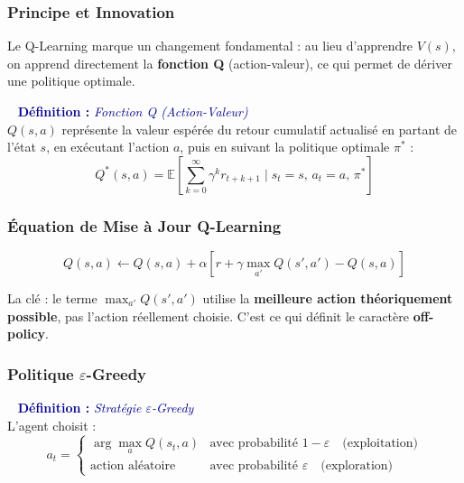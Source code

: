 \documentclass[11pt,a4paper]{article}
\newenvironment{defbox}[1]{%
  \vspace{3pt}\begin{framed}
  \noindent{\color{NavyBlue}\rule{0.3cm}{3pt}}~%
  \textcolor{DarkBlue}{\textbf{Définition :} \textit{#1}}\\[3pt]}
  {\end{framed}\vspace{3pt}}
\newcommand{\E}{\mathbb{E}}
\begin{document}
\subsubsection{Principe et Innovation}

Le Q-Learning marque un changement fondamental : au lieu d'apprendre $V(s)$, on apprend directement la \textbf{fonction Q} (action-valeur), ce qui permet de dériver une politique optimale.

\begin{defbox}{Fonction Q (Action-Valeur)}
$Q(s, a)$ représente la valeur espérée du retour cumulatif actualisé en partant de l'état $s$, en exécutant l'action $a$, puis en suivant la politique optimale $\pi^*$ :
$$Q^*(s, a) = \E\left[\sum_{k=0}^{\infty} \gamma^k r_{t+k+1} \;\Big|\; s_t=s,\, a_t=a,\, \pi^*\right]$$
\end{defbox}

\subsubsection{Équation de Mise à Jour Q-Learning}

\begin{tcolorbox}[colback=LightOrange,colframe=DarkOrange,arc=4pt]
\begin{equation}
  \boxed{Q(s,a) \leftarrow Q(s,a) + \alpha \left[r + \gamma \max_{a'} Q(s',a') - Q(s,a)\right]}
\end{equation}
\end{tcolorbox}

La clé : le terme $\max_{a'} Q(s', a')$ utilise la \textbf{meilleure action théoriquement possible}, pas l'action réellement choisie. C'est ce qui définit le caractère \textbf{off-policy}.

\subsubsection{Politique $\varepsilon$-Greedy}

\begin{defbox}{Stratégie $\varepsilon$-Greedy}
L'agent choisit :
$$a_t = \begin{cases}
\arg\max_a Q(s_t, a) & \text{avec probabilité } 1-\varepsilon \quad \text{(exploitation)}\\
\text{action aléatoire} & \text{avec probabilité } \varepsilon \quad \text{(exploration)}
\end{cases}$$
\end{defbox}
\end{document}
